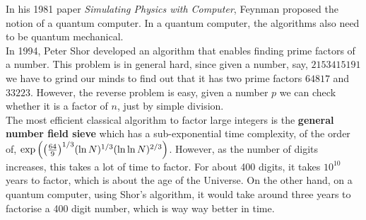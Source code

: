 In his 1981 paper \textit{Simulating Physics with Computer}, Feynman proposed the notion of a quantum computer. In a quantum computer, the algorithms also need to be quantum mechanical. \\[0.2cm]
In 1994, Peter Shor developed an algorithm that enables finding prime factors of a number. This problem is in general hard, since given a number, say, $2153415191$ we have to grind our minds to find out that it has two prime factors $64817$ and $33223$. However, the reverse problem is easy, given a number $p$ we can check whether it is a factor of $n$, just by simple division.\\[0.2cm]
The most efficient classical algorithm to factor large integers is the \textbf{general number field sieve} which has a sub-exponential time complexity, of the order of, $\exp\qty(\qty(\frac{64}{9})^{1/3}(\ln N)^{1/3}(\ln \ln N)^{2/3})$. However, as the number of digits increases, this takes a lot of time to factor. For about 400 digits, it takes $10^{10}$ years to factor, which is about the age of the Universe. On the other hand, on a quantum computer, using Shor's algorithm, it would take around three years to factorise a 400 digit number, which is way way better in time.
